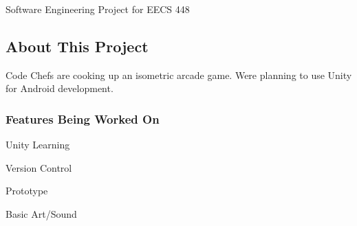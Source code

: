 Software Engineering Project for E\+E\+CS 448 \subsection*{About This Project}

Code Chefs are cooking up an isometric arcade game. We\textquotesingle{}re planning to use Unity for Android development.

\subsubsection*{Features Being Worked On}


\begin{DoxyItemize}
\item Unity Learning
\item Version Control
\item Prototype
\item Basic Art/\+Sound 
\end{DoxyItemize}